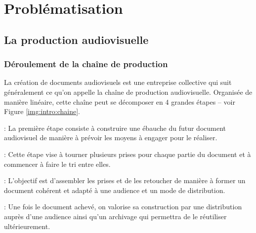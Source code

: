 
\chapter{Problématisation}\label{chap:problo}

\section{La production audiovisuelle}\label{sec:metier}


\subsection{Déroulement de la chaîne de production}\label{sec:prod}
La création de documents audiovisuels est une entreprise collective qui suit généralement ce qu'on appelle la chaîne de production audiovisuelle. 
Organisée de manière linéaire, cette chaîne peut se décomposer en 4 grandes étapes -- voir Figure \ref{img:intro:chaine}.

\begin{liste} 
	\item {} : La première étape consiste à construire une ébauche du futur document audiovisuel de manière à prévoir les moyens à engager pour le réaliser.

	\item {} : Cette étape vise à tourner plusieurs prises pour chaque partie du document et à commencer à faire le tri entre elles.

	\item {} : L'objectif est d'assembler les prises et de les retoucher de manière à former un document cohérent et adapté à une audience et un mode de distribution.

	\item {} : Une fois le document achevé, on valorise sa construction par une distribution auprès d'une audience ainsi qu'un archivage qui permettra de le réutiliser ultérieurement.
\end{liste}

